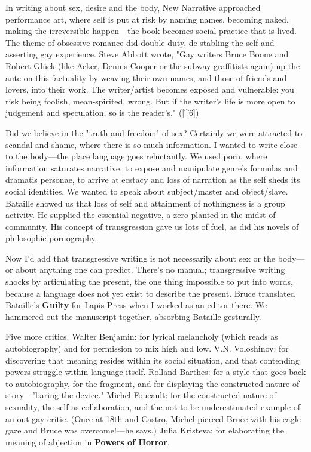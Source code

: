 In writing about sex, desire and the body, New Narrative approached
performance art, where self is put at risk by naming names, becoming
naked, making the irreversible happen---the book becomes social practice
that is lived. The theme of obsessive romance did double duty,
de-stabling the self and asserting gay experience. Steve Abbott wrote,
"Gay writers Bruce Boone and Robert Glück (like Acker, Dennis Cooper or
the subway graffitists again) up the ante on this factuality by weaving
their own names, and those of friends and lovers, into their work. The
writer/artist becomes exposed and vulnerable: you risk being foolish,
mean-spirited, wrong. But if the writer's life is more open to judgement
and speculation, so is the reader's." ({[}\^{}6{]})

Did we believe in the "truth and freedom" of sex? Certainly we were
attracted to scandal and shame, where there is so much information. I
wanted to write close to the body---the place language goes reluctantly.
We used porn, where information saturates narrative, to expose and
manipulate genre's formulas and dramatis personae, to arrive at ecstacy
and loss of narration as the self sheds its social identities. We wanted
to speak about subject/master and object/slave. Bataille showed us that
loss of self and attainment of nothingness is a group activity. He
supplied the essential negative, a zero planted in the midst of
community. His concept of transgression gave us lots of fuel, as did his
novels of philosophic pornography.

Now I'd add that transgressive writing is not necessarily about sex or
the body---or about anything one can predict. There's no manual;
transgressive writing shocks by articulating the present, the one thing
impossible to put into words, because a language does not yet exist to
describe the present. Bruce translated Bataille's \textbf{Guilty} for
Lapis Press when I worked as an editor there. We hammered out the
manuscript together, absorbing Bataille gesturally.

Five more critics. Walter Benjamin: for lyrical melancholy (which reads
as autobiography) and for permission to mix high and low. V.N.
Voloshinov: for discovering that meaning resides within its social
situation, and that contending powers struggle within language itself.
Rolland Barthes: for a style that goes back to autobiography, for the
fragment, and for displaying the constructed nature of story---"baring
the device." Michel Foucault: for the constructed nature of sexuality,
the self as collaboration, and the not-to-be-underestimated example of
an out gay critic. (Once at 18th and Castro, Michel pierced Bruce with
his eagle gaze and Bruce was overcome!---he says.) Julia Kristeva: for
elaborating the meaning of abjection in \textbf{Powers of Horror}.

